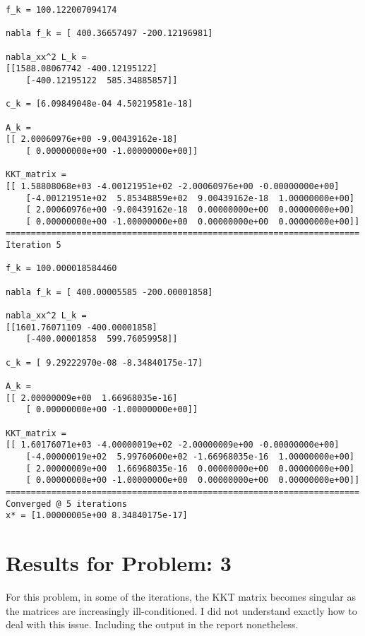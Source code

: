 \documentclass{article}
\begin{document}
\begin{verbatim}
f_k = 100.122007094174

nabla f_k = [ 400.36657497 -200.12196981]

nabla_xx^2 L_k = 
[[1588.08067742 -400.12195122]
    [-400.12195122  585.34885857]]

c_k = [6.09849048e-04 4.50219581e-18]

A_k = 
[[ 2.00060976e+00 -9.00439162e-18]
    [ 0.00000000e+00 -1.00000000e+00]]

KKT_matrix = 
[[ 1.58808068e+03 -4.00121951e+02 -2.00060976e+00 -0.00000000e+00]
    [-4.00121951e+02  5.85348859e+02  9.00439162e-18  1.00000000e+00]
    [ 2.00060976e+00 -9.00439162e-18  0.00000000e+00  0.00000000e+00]
    [ 0.00000000e+00 -1.00000000e+00  0.00000000e+00  0.00000000e+00]]
======================================================================
Iteration 5

f_k = 100.000018584460

nabla f_k = [ 400.00005585 -200.00001858]

nabla_xx^2 L_k = 
[[1601.76071109 -400.00001858]
    [-400.00001858  599.76059958]]

c_k = [ 9.29222970e-08 -8.34840175e-17]

A_k = 
[[ 2.00000009e+00  1.66968035e-16]
    [ 0.00000000e+00 -1.00000000e+00]]

KKT_matrix = 
[[ 1.60176071e+03 -4.00000019e+02 -2.00000009e+00 -0.00000000e+00]
    [-4.00000019e+02  5.99760600e+02 -1.66968035e-16  1.00000000e+00]
    [ 2.00000009e+00  1.66968035e-16  0.00000000e+00  0.00000000e+00]
    [ 0.00000000e+00 -1.00000000e+00  0.00000000e+00  0.00000000e+00]]
======================================================================
Converged @ 5 iterations
x* = [1.00000005e+00 8.34840175e-17]
\end{verbatim}

\section*{Results for Problem: 3}
For this problem, in some of the iterations, the KKT matrix becomes singular as the matrices are increasingly ill-conditioned. I did not understand
exactly how to deal with this issue. Including the output in the report nonetheless.
\end{document}
